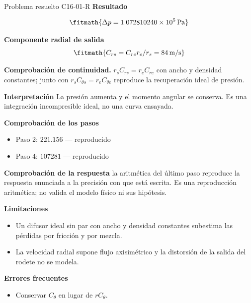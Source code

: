 \documentclass[10pt,openany]{book}
\begin{document}
\begin{studiumworked}{Problema resuelto C16-01-R}
\noindent\textbf{Resultado}

\[
\fitmath{\Delta p=1.072810240\times10^{5}\,\mathrm{Pa}}
\]

\noindent\textbf{Componente radial de salida}
\[
\fitmath{C_{rs}=C_{re}r_e/r_s=84\,\mathrm{m/s}}
\]

\noindent\textbf{Comprobación de continuidad.} $r_sC_{rs}=r_eC_{re}$ con ancho y densidad constantes; junto con $r_sC_{\theta s}=r_eC_{\theta e}$ reproduce la recuperación ideal de presión.

\noindent\textbf{Interpretación}
La presión aumenta y el momento angular se conserva. Es una integración incompresible ideal, no una curva ensayada.

\noindent\textbf{Comprobación de los pasos}
\begin{itemize}
\item Paso 2: $221.156$ — reproducido
\item Paso 4: $107281$ — reproducido
\end{itemize}

\noindent\textbf{Comprobación de la respuesta} la aritmética del último paso reproduce la respuesta enunciada a la precisión con que está escrita. Es una reproducción aritmética; no valida el modelo físico ni sus hipótesis.

\noindent\textbf{Limitaciones}
\begin{itemize}
\item Un difusor ideal sin par con ancho y densidad constantes subestima las pérdidas por fricción y por mezcla.
\item La velocidad radial supone flujo axisimétrico y la distorsión de la salida del rodete no se modela.
\end{itemize}

\noindent\textbf{Errores frecuentes}
\begin{itemize}
\item Conservar $C_\theta$ en lugar de $rC_\theta$.
\end{itemize}
\end{studiumworked}
\end{document}
